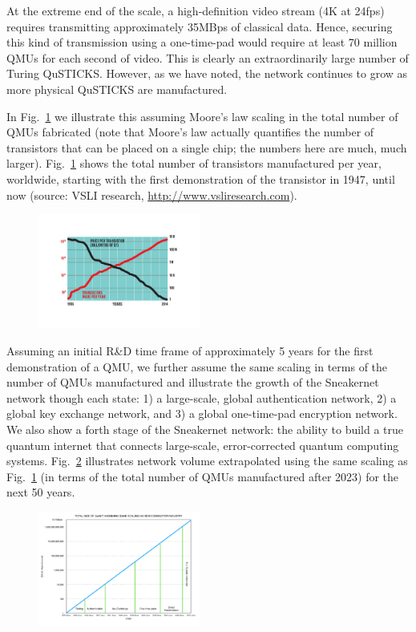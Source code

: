 \documentclass[twocolumn, aps, rmp, amsmath, amssymb, nofootinbib, superscriptaddress, longbibliography, floatfix, table-of-contents, eqsecnum]{revtex4-2}
\begin{document}
At the extreme end of the scale, a high-definition video stream (4K at 24fps) requires transmitting approximately 35MBps of classical data. Hence, securing this kind of transmission using a one-time-pad would require at least 70 million QMUs for each second of video. This is clearly an extraordinarily large number of Turing QuSTICKS. However, as we have noted, the network continues to grow as more physical QuSTICKS are manufactured. 

In Fig.~\ref{fig:transistor} we illustrate this assuming Moore's law scaling in the total number of QMUs fabricated (note that Moore's law actually quantifies the number of transistors that can be placed on a single chip; the numbers here are much, much larger). Fig.~\ref{fig:transistor} shows the total number of transistors manufactured per year, worldwide, starting with the first demonstration of the transistor in 1947, until now (source: VSLI research, \href{http://www.vsliresearch.com}{http://www.vsliresearch.com}). 

\begin{figure}[htbp!]
	\includegraphics[clip=true, width=0.475\textwidth]{transistor}
	\caption{} \label{fig:transistor}
\end{figure}

Assuming an initial R\&D time frame of approximately 5 years for the first demonstration of a QMU, we further assume the same scaling in terms of the number of QMUs manufactured and illustrate the growth of the Sneakernet network though each state: 1) a large-scale, global authentication network, 2) a global key exchange network, and 3) a global one-time-pad encryption network. We also show a forth stage of the Sneakernet network: the ability to build a true quantum internet that connects large-scale, error-corrected quantum computing systems. Fig.~\ref{fig:QMU} illustrates network volume extrapolated using the same scaling as Fig.~\ref{fig:transistor} (in terms of the total number of QMUs manufactured after 2023) for the next 50 years. 

\begin{figure}[htbp!]
	\includegraphics[clip=true, width=0.475\textwidth]{QMU}
	\caption{} \label{fig:QMU}
\end{figure}
\end{document}
